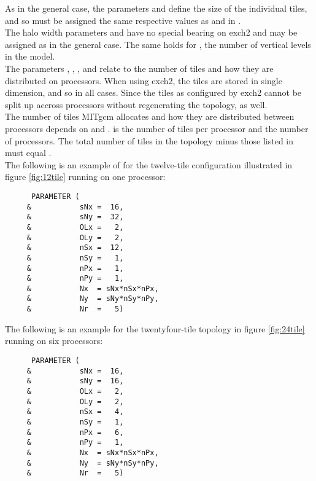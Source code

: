 As in the general case, the parameters  and
 define the size of the individual tiles, and so
must be assigned the same respective values as  and
 in .\\

The halo width parameters  and 
have no special bearing on exch2 and may be assigned as in the general
case. The same holds for , the number of vertical 
levels in the model.\\

The parameters , ,
, and  relate to the number of
tiles and how they are distributed on processors.  When using exch2,
the tiles are stored in single dimension, and so
 in all cases.  Since the tiles as
configured by exch2 cannot be split up accross processors without
regenerating the topology,  as well. \\

The number of tiles MITgcm allocates and how they are distributed
between processors depends on  and
.   is the number of tiles per
processor and  the number of processors.  The total
number of tiles in the topology minus those listed in
 must equal . \\

The following is an example of  for the twelve-tile
configuration illustrated in figure \ref{fig:12tile} running on 
one processor: \\

\begin{verbatim}
      PARAMETER (
     &           sNx =  16,
     &           sNy =  32,
     &           OLx =   2,
     &           OLy =   2,
     &           nSx =  12,
     &           nSy =   1,
     &           nPx =   1,
     &           nPy =   1,
     &           Nx  = sNx*nSx*nPx,
     &           Ny  = sNy*nSy*nPy,
     &           Nr  =   5)
\end{verbatim}

The following is an example for the twentyfour-tile topology in figure
\ref{fig:24tile} running on six processors:

\begin{verbatim}
      PARAMETER (
     &           sNx =  16,
     &           sNy =  16,
     &           OLx =   2,
     &           OLy =   2,
     &           nSx =   4,
     &           nSy =   1,
     &           nPx =   6,
     &           nPy =   1,
     &           Nx  = sNx*nSx*nPx,
     &           Ny  = sNy*nSy*nPy,
     &           Nr  =   5)
\end{verbatim}





